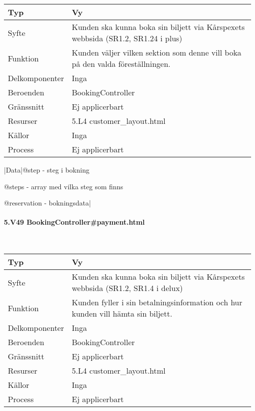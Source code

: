 \documentclass[a4paper, twoside, 11pt, titlepage]{article}
\begin{document}
			\begin {table} [ht] \begin{tabular} {  p{3.5cm} p{9.6cm} }
				\hline
				Typ & Vy  \\
				\hline
				Syfte & Kunden ska kunna boka sin biljett via Kårspexets webbsida (SR1.2, SR1.24 i  plus)  \\
				\hline
				Funktion & Kunden väljer vilken sektion som denne vill boka på den valda föreställningen.  \\
				\hline
				Delkomponenter & Inga  \\
				\hline
				Beroenden & BookingController  \\
				\hline
				Gränssnitt & Ej applicerbart  \\
				\hline
				Resurser & 5.L4 customer\_layout.html  \\
				\hline
				Källor & Inga  \\
				\hline
				Process & Ej applicerbart  \\
				\hline
			\end{tabular} \end{table} \FloatBarrier
			\vspace{6mm}

			|Data|@step - steg i bokning

			@steps - array med vilka steg som finns

			@reservation - bokningsdata|

			\paragraph{5.V49 BookingController\#payment.html}\

			\begin {table} [ht] \begin{tabular} {  p{3.5cm} p{9.6cm} }
				\hline
				Typ & Vy  \\
				\hline
				Syfte & Kunden ska kunna boka sin biljett via Kårspexets webbsida (SR1.2, SR1.4 i delux)  \\
				\hline
				Funktion & Kunden fyller i sin betalningsinformation och hur kunden vill hämta sin biljett.  \\
				\hline
				Delkomponenter & Inga  \\
				\hline
				Beroenden & BookingController  \\
				\hline
				Gränssnitt & Ej applicerbart  \\
				\hline
				Resurser & 5.L4 customer\_layout.html  \\
				\hline
				Källor & Inga  \\
				\hline
				Process & Ej applicerbart  \\
				\hline
			\end{tabular} \end{table} \FloatBarrier
			\vspace{6mm}
\end{document}

